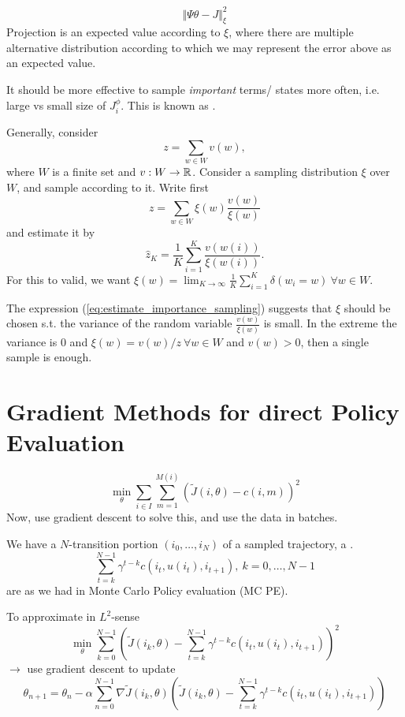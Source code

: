 \[\Vert \Psi\theta-J\Vert_\xi^2\]
Projection is an expected value according to \(\xi\), where 
there are multiple alternative distribution according to which 
we may represent the error above as an expected value.

It should be more effective to sample  \textit{important} terms/ states 
more often, i.e. large vs small size of \(J_i^\phi\). This is known as 
.

Generally, consider 
\[z=\sum_{w\in W}v(w),\]
where \(W\) is a finite set and \(v:W\to\mathbb{R}\). Consider a sampling distribution 
\(\xi\) over \(W\), and sample according to it. Write first 
\[z=\sum_{w\in W} \xi(w)\frac{v(w)}{\xi(w)}\]
and estimate it by 
\begin{equation}\label{eq:estimate_importance_sampling}
    \hat{z}_K=\frac{1}{K}\sum_{i=1}^K \frac{v(w(i))}{\xi(w(i))}.  
\end{equation}
For this to valid, we want \(\xi(w)=\lim_{K\to\infty} \frac{1}{K}\sum_{i=1}^{K}\delta(w_i=w)\ \forall w\in W\).

The expression (\ref{eq:estimate_importance_sampling}) suggests that \(\xi\) should be chosen s.t. 
the variance of the random variable \(\frac{v(w)}{\xi(w)}\) is small. In the extreme the 
variance is 0 and \(\xi(w)=v(w)/z\ \forall w\in W\) and \(v(w)>0\), then a single sample is enough. 



\section{Gradient Methods for direct Policy Evaluation}

\[\min_{\theta}\sum_{i\in I}\sum_{m=1}^{M(i)}\left(\tilde{J}(i,\theta)-c(i,m)\right)^2\]
Now, use gradient descent to solve this, and use the data in batches.

We have a \(N\)-transition portion \((i_0,\dots,i_N)\) of 
a sampled trajectory, a .
\[\sum_{t=k}^{N-1}\gamma^{t-k}c(i_t,u(i_t),i_{t+1}),\ k=0,\dots,N-1\]
are  as we  had in Monte Carlo Policy evaluation (MC PE).

To approximate in \(L^2\)-sense 
\[\min_\theta\sum_{k=0}^{N-1}\left(\tilde{J}(i_k,\theta)-\sum_{t=k}^{N-1} \gamma^{t-k}c(i_t,u(i_t),i_{t+1})\right)^2\]
\(\to\) use gradient descent to update 
\[\theta_{n+1}=\theta_n-\alpha\sum_{n=0}^{N-1}\nabla \tilde{J}(i_k,\theta)\left(\tilde{J}(i_k,\theta)-\sum_{t=k}^{N-1} \gamma^{t-k}c(i_t,u(i_t),i_{t+1})\right)\]

